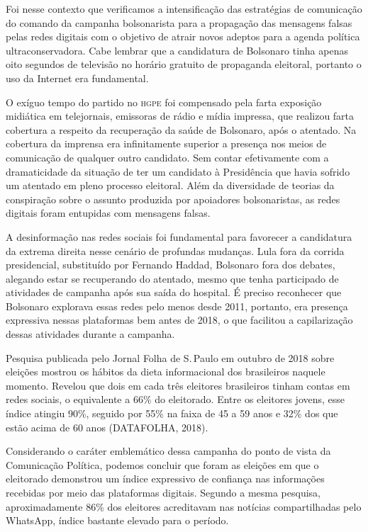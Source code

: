 Foi nesse contexto que verificamos a intensificação das estratégias de
comunicação do comando da campanha bolsonarista para a propagação das
mensagens falsas pelas redes digitais com o objetivo de atrair novos
adeptos para a agenda política ultraconservadora. Cabe lembrar que a
candidatura de Bolsonaro tinha apenas oito segundos de televisão no
horário gratuito de propaganda eleitoral, portanto o uso da Internet era
fundamental.

O exíguo tempo do partido no \textsc{hgpe} foi compensado pela farta exposição
midiática em telejornais, emissoras de rádio e mídia impressa, que
realizou farta cobertura a respeito da recuperação da saúde de
Bolsonaro, após o atentado. Na cobertura da imprensa era infinitamente
superior a presença nos meios de comunicação de qualquer outro
candidato. Sem contar efetivamente com a dramaticidade da situação de
ter um candidato à Presidência que havia sofrido um atentado em pleno
processo eleitoral. Além da diversidade de teorias da conspiração sobre
o assunto produzida por apoiadores bolsonaristas, as redes digitais
foram entupidas com mensagens falsas.

A desinformação nas redes sociais foi fundamental para favorecer a
candidatura da extrema direita nesse cenário de profundas mudanças. Lula
fora da corrida presidencial, substituído por Fernando Haddad, Bolsonaro
fora dos debates, alegando estar se recuperando do atentado, mesmo que
tenha participado de atividades de campanha após sua saída do hospital.
É preciso reconhecer que Bolsonaro explorava essas redes pelo menos
desde 2011, portanto, era presença expressiva nessas plataformas bem
antes de 2018, o que facilitou a capilarização dessas atividades durante
a campanha.

Pesquisa publicada pelo Jornal Folha de S.\,Paulo em outubro de 2018
sobre eleições mostrou os hábitos da dieta informacional dos brasileiros
naquele momento. Revelou que dois em cada três eleitores brasileiros
tinham contas em redes sociais, o equivalente a 66\% do eleitorado.
Entre os eleitores jovens, esse índice atingiu 90\%, seguido por 55\% na
faixa de 45 a 59 anos e 32\% dos que estão acima de 60 anos (DATAFOLHA,
2018).

Considerando o caráter emblemático dessa campanha do ponto de vista da
Comunicação Política, podemos concluir que foram as eleições em que o
eleitorado demonstrou um índice expressivo de confiança nas informações
recebidas por meio das plataformas digitais. Segundo a mesma pesquisa,
aproximadamente 86\% dos eleitores acreditavam nas notícias
compartilhadas pelo WhatsApp, índice bastante elevado para o período.

